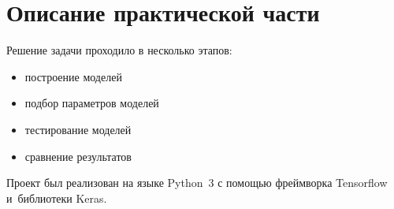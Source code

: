 \section{Описание практической части}

Решение задачи проходило в несколько этапов:

\begin{itemize}
  \item построение моделей 
  \item подбор параметров моделей
  \item тестирование моделей
  \item сравнение результатов
\end{itemize}

Проект был реализован на языке Python~3 с помощью фреймворка Tensorflow и~библиотеки Keras.

